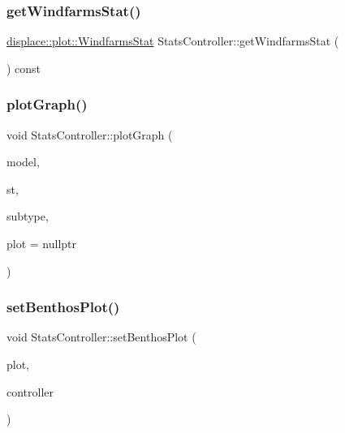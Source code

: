 \mbox{\label{class_stats_controller_a11d392bda81a610e515797ee49e9d94d}} 
\subsubsection{\texorpdfstring{getWindfarmsStat()}{getWindfarmsStat()}}
{\footnotesize\ttfamily \mbox{\hyperlink{namespacedisplace_1_1plot_a8b9bfd155809bb203b09c572304a62c3}{displace\+::plot\+::\+Windfarms\+Stat}} Stats\+Controller\+::get\+Windfarms\+Stat (\begin{DoxyParamCaption}{ }\end{DoxyParamCaption}) const\hspace{0.3cm}{\ttfamily [inline]}}

\mbox{\label{class_stats_controller_a41acab0d55b925b49ce267ba4e98438e}} 
\subsubsection{\texorpdfstring{plotGraph()}{plotGraph()}}
{\footnotesize\ttfamily void Stats\+Controller\+::plot\+Graph (\begin{DoxyParamCaption}\item[{\mbox{\hyperlink{class_displace_model}{Displace\+Model}} $\ast$}]{model,  }\item[{\mbox{\hyperlink{class_stats_controller_a57467d760850639d3b0c55277b7e7ee9}{Stats\+Controller\+::\+Stat\+Type}}}]{st,  }\item[{int}]{subtype,  }\item[{\mbox{\hyperlink{class_q_custom_plot}{Q\+Custom\+Plot}} $\ast$}]{plot = {\ttfamily nullptr} }\end{DoxyParamCaption})}

\mbox{\label{class_stats_controller_ac789cf514d6e03a4f35871b4347a113c}} 
\subsubsection{\texorpdfstring{setBenthosPlot()}{setBenthosPlot()}}
{\footnotesize\ttfamily void Stats\+Controller\+::set\+Benthos\+Plot (\begin{DoxyParamCaption}\item[{\mbox{\hyperlink{class_plot_widget}{Plot\+Widget}} $\ast$}]{plot,  }\item[{\mbox{\hyperlink{class_graph_interaction_controller}{Graph\+Interaction\+Controller}} $\ast$}]{controller }\end{DoxyParamCaption})}

